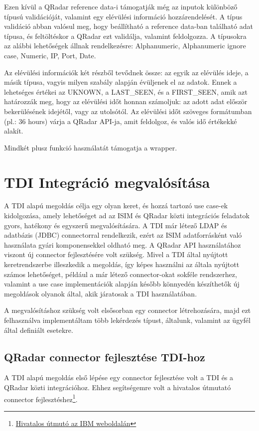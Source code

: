 Ezen kívül a QRadar reference data-i támogatják még az inputok különböző típusú validációját, valamint egy elévülési információ hozzárendelését. A típus validáció abban valósul meg, hogy beállítható a reference data-ban található adat típusa, és feltöltéskor a QRadar ezt validálja, valamint feldolgozza. A típusokra az alábbi lehetőségek állnak rendelkezésre: Alphanumeric, Alphanumeric ignore case, Numeric, IP, Port, Date. 

Az elévülési információk két részből tevődnek össze: az egyik az elévülés ideje, a másik típusa, vagyis milyen szabály alapján évüljenek el az adatok. Ennek a lehetséges értékei az UKNOWN, a LAST\_SEEN, és a FIRST\_SEEN, amik azt határozzák meg, hogy az elévülési időt honnan számoljuk: az adott adat először bekerülésének idejétől, vagy az utolsótól. Az elévülési időt szöveges formátumban (pl.: 36 hours) várja a QRadar API-ja, amit feldolgoz, és valós idő értékekké alakít.

Mindkét plusz funkció használatát támogatja a wrapper.

\section{TDI Integráció megvalósítása}
A TDI alapú megoldás célja egy olyan keret, és hozzá tartozó use case-ek kidolgozása, amely lehetőséget ad az ISIM és QRadar közti integrációs feladatok gyors, hatékony és egyszerű megvalósítására. 
A TDI már létező LDAP és adatbázis (JDBC) connectorral rendelkezik, ezért az ISIM adatforrásként való használata gyári komponensekkel oldható meg. A QRadar API használatához viszont új connector fejlesztésére volt szükség.
Mivel a TDI által nyújtott keretrendszerbe illeszkedik a megoldás, így képes használni az általa nyújtott számos lehetőséget, például a már létező connector-okat sokféle rendszerhez, valamint a use case implementációk alapján később könnyedén készíthetők új megoldások olyanok által, akik járatosak a TDI használatában. 

A megvalósításhoz szükség volt elsősorban egy connector létrehozására, majd ezt felhasználva implementáltam több lekérdezés típust, általunk, valamint az ügyfél által definiált esetekre.
 
\subsection{QRadar connector fejlesztése TDI-hoz}\label{subsec:connimpl}

A TDI alapú megoldás első lépése egy connector fejlesztése volt a TDI és a QRadar közti integrációhoz. Ehhez segítségemre volt a hivatalos útmutató connector fejlesztéshez\footnote{\href{https://www.ibm.com/support/knowledgecenter/en/SSCQGF_7.1.0/com.ibm.IBMDI.doc_7.1/referenceguide155.htm}{Hivatalos útmutó az IBM weboldalán}}. 

